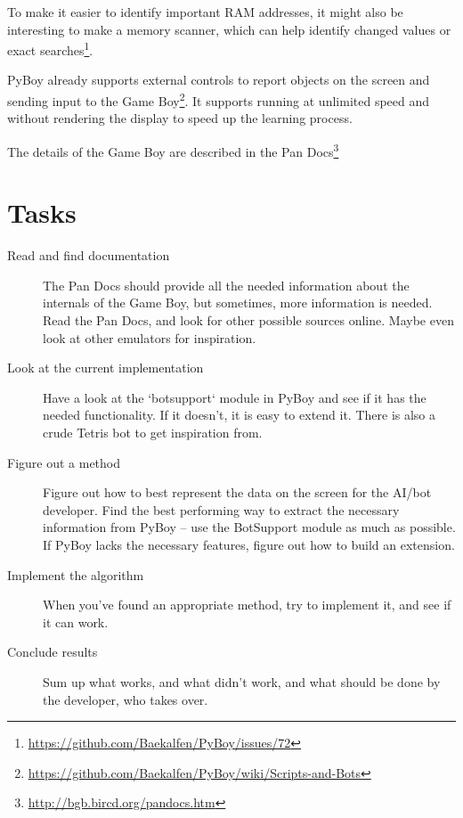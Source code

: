 \documentclass[11pt]{report} %
\begin{document}
To make it easier to identify important RAM addresses, it might also be interesting to make a memory scanner, which can help identify changed values or exact searches\footnote{\url{https://github.com/Baekalfen/PyBoy/issues/72}}.

PyBoy already supports external controls to report objects on the screen and sending input to the Game Boy\footnote{\url{https://github.com/Baekalfen/PyBoy/wiki/Scripts-and-Bots}}. It supports running at unlimited speed and without rendering the display to speed up the learning process.

The details of the Game Boy are described in the Pan Docs\footnote{\url{http://bgb.bircd.org/pandocs.htm}}

\section*{Tasks}
\begin{description}
    \item [Read and find documentation]
        The Pan Docs should provide all the needed information about the internals of the Game Boy, but sometimes, more information is needed. Read the Pan Docs, and look for other possible sources online. Maybe even look at other emulators for inspiration.

    \item [Look at the current implementation]
        Have a look at the `botsupport` module in PyBoy and see if it has the needed functionality. If it doesn't, it is easy to extend it. There is also a crude Tetris bot to get inspiration from.

    \item [Figure out a method]
        Figure out how to best represent the data on the screen for the AI/bot developer. Find the best performing way to extract the necessary information from PyBoy -- use the BotSupport module as much as possible. If PyBoy lacks the necessary features, figure out how to build an extension.

    \item [Implement the algorithm]
        When you've found an appropriate method, try to implement it, and see if it can work.

    \item [Conclude results]
        Sum up what works, and what didn't work, and what should be done by the developer, who takes over.

\end{description}
\end{document}

